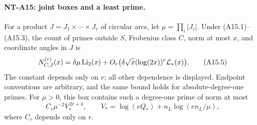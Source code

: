 \paragraph{NT-A15: joint boxes and a least prime.}
For a product \(J=J_1\times\cdots\times J_r\) of circular
arcs, let \(\mu=\prod_i|J_i|\). Under (A15.1)--(A15.3),
the count of primes outside \(S\), Frobenius class \(C\),
norm at most \(x\), and coordinate angles in \(J\) is
\[
 N_{C,J}^{(r)}(x)=\delta\mu\operatorname{Li}_2(x)
       +O_r\bigl(\delta\sqrt x
                    (\log(2x))^r{\cal L}_*(x)\bigr).
                                                               \tag{A15.5}
\]
The constant depends only on \(r\); all other dependence
is displayed. Endpoint conventions are arbitrary, and
the same bound holds for absolute-degree-one primes.
For \(\mu>0\), this box contains such a degree-one prime
of norm at most
\[
 C_r\mu^{-2}V_*^{\,2r+4},\qquad
       V_*=\log(eQ_*)+n_L\log(e n_L/\mu),                 \tag{A15.6}
\]
where \(C_r\) depends only on \(r\).

